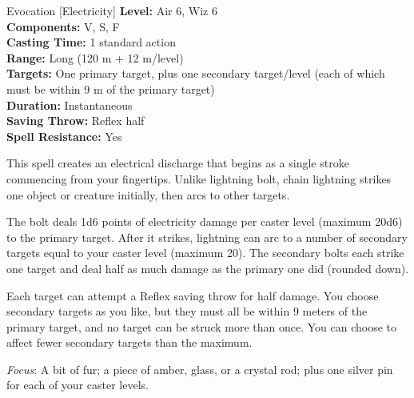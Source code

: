 {Evocation [Electricity]}
{
	\textbf{Level:}
	Air 6, Wiz 6\\
	\textbf{Components:}
	V, S, F\\
	\textbf{Casting Time:}
	1 standard action\\
	\textbf{Range:}
	Long (120 m + 12 m/level)\\
	\textbf{Targets:}
	One primary target, plus one secondary target/level (each of which must be within 9 m of the primary target)\\
	\textbf{Duration:}
	Instantaneous\\
	\textbf{Saving Throw:}
	Reflex half\\
	\textbf{Spell Resistance:}
	Yes\\
}
{
	This spell creates an electrical discharge that begins as a single stroke commencing from your fingertips. Unlike lightning bolt, chain lightning strikes one object or creature initially, then arcs to other targets.

	The bolt deals 1d6 points of electricity damage per caster level (maximum 20d6) to the primary target. After it strikes, lightning can arc to a number of secondary targets equal to your caster level (maximum 20). The secondary bolts each strike one target and deal half as much damage as the primary one did (rounded down).

	Each target can attempt a Reflex saving throw for half damage. You choose secondary targets as you like, but they must all be within 9 meters of the primary target, and no target can be struck more than once. You can choose to affect fewer secondary targets than the maximum.

	\textit{Focus}:
	A bit of fur; a piece of amber, glass, or a crystal rod; plus one silver pin for each of your caster levels.

}
